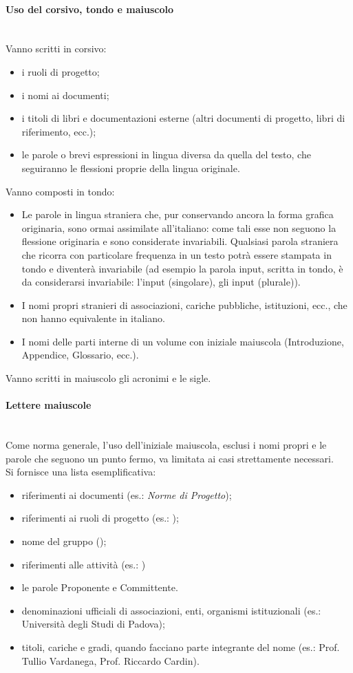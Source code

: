 \paragraph{Uso del corsivo, tondo e maiuscolo} \label{sec:corsivo_tondo_maiuscolo} \mbox{} \\
Vanno scritti in corsivo:
\begin{itemize}
	\item i ruoli di progetto;
	\item i nomi ai documenti;
	\item i titoli di libri e documentazioni esterne (altri documenti di progetto, libri di riferimento, ecc.);
	\item le parole o brevi espressioni in lingua diversa da quella del testo, che seguiranno le flessioni proprie della lingua originale.
\end{itemize}
Vanno composti in tondo:
\begin{itemize}
	\item Le parole in lingua straniera che, pur conservando ancora la forma grafica originaria, sono ormai assimilate all'italiano: come tali esse non seguono la flessione originaria e sono considerate invariabili. Qualsiasi parola straniera che ricorra con particolare frequenza in un testo potrà essere stampata in tondo e diventerà invariabile (ad esempio la parola input, scritta in tondo, è da considerarsi invariabile: l'input (singolare), gli input (plurale)).
	\item I nomi propri stranieri di associazioni, cariche pubbliche, istituzioni, ecc., che non hanno equivalente in italiano.
	\item I nomi delle parti interne di un volume con iniziale maiuscola (Introduzione, Appendice, Glossario, ecc.).
\end{itemize}
Vanno scritti in maiuscolo gli acronimi e le sigle.

\paragraph{Lettere maiuscole}\label{sec:lettere_maiuscole} \mbox{} \\
Come norma generale, l'uso dell'iniziale maiuscola, esclusi i nomi propri e le parole che seguono un punto fermo, va limitata ai casi strettamente necessari.\\
Si fornisce una lista esemplificativa:
\begin{itemize}
	\item riferimenti ai documenti (es.: \textit{Norme di Progetto});
	\item riferimenti ai ruoli di progetto (es.: \Amministratore);
	\item nome del gruppo (\GroupName);
	\item riferimenti alle attività (es.: \VV) 
	\item le parole Proponente e Committente.
	\item denominazioni ufficiali di associazioni, enti, organismi istituzionali (es.: Università degli Studi di Padova);
	\item titoli, cariche e gradi, quando facciano parte integrante del nome (es.: Prof. Tullio Vardanega, Prof. Riccardo Cardin).
\end{itemize}

